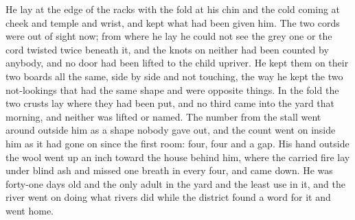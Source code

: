 He lay at the edge of the racks with the fold at his chin and the cold coming at cheek and temple and wrist, and kept what had been given him. The two cords were out of sight now; from where he lay he could not see the grey one or the cord twisted twice beneath it, and the knots on neither had been counted by anybody, and no door had been lifted to the child upriver. He kept them on their two boards all the same, side by side and not touching, the way he kept the two not-lookings that had the same shape and were opposite things. In the fold the two crusts lay where they had been put, and no third came into the yard that morning, and neither was lifted or named. The number from the stall went around outside him as a shape nobody gave out, and the count went on inside him as it had gone on since the first room: four, four and a gap. His hand outside the wool went up an inch toward the house behind him, where the carried fire lay under blind ash and missed one breath in every four, and came down. He was forty-one days old and the only adult in the yard and the least use in it, and the river went on doing what rivers did while the district found a word for it and went home.
